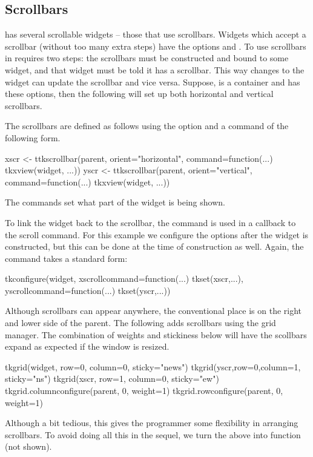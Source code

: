 \subsection{Scrollbars}
\label{sec:tcltk:scrollbars}

\TK\/ has several scrollable widgets -- those that use scrollbars.
Widgets which accept a scrollbar (without too many extra steps) have
the options  and .  To use
scrollbars in  requires two steps: the scrollbars must be
constructed and bound to some widget, and that widget must be told it
has a scrollbar. This way changes to the widget can update the
scrollbar and vice versa. Suppose,  is a container and
 has these options, then the following will set up both
horizontal and vertical scrollbars.

The scrollbars are defined as follows using the
 option and a command of the following
form.
\begin{Schunk}
\begin{Sinput}
 xscr <- ttkscrollbar(parent, orient="horizontal",
                      command=function(...) tkxview(widget, ...))
 yscr <- ttkscrollbar(parent, orient="vertical",
                      command=function(...) tkxview(widget, ...))
\end{Sinput}
\end{Schunk}
The  commands set what part of the widget is being shown.

To link the widget back to the scrollbar, the  command is
used in a callback to the scroll command.  For this example we
configure the options after the widget is constructed, but this can be
done at the time of construction as well. Again, the command takes a
standard form:
\begin{Schunk}
\begin{Sinput}
 tkconfigure(widget,
             xscrollcommand=function(...) tkset(xscr,...),
             yscrollcommand=function(...) tkset(yscr,...))
\end{Sinput}
\end{Schunk}

Although scrollbars can appear anywhere, the conventional place is on the right and lower side of the parent. The following adds scrollbars using the grid manager. The combination of weights and stickiness below will have the scollbars expand as expected if the window is resized. 
\begin{Schunk}
\begin{Sinput}
 tkgrid(widget, row=0, column=0, sticky="news")
 tkgrid(yscr,row=0,column=1, sticky="ns")
 tkgrid(xscr, row=1, column=0, sticky="ew")
 tkgrid.columnconfigure(parent, 0, weight=1)
 tkgrid.rowconfigure(parent, 0, weight=1)
\end{Sinput}
\end{Schunk}
Although a bit tedious, this gives the programmer some flexibility in arranging scrollbars. To avoid doing all this in the sequel, we turn the above into function  (not shown).


